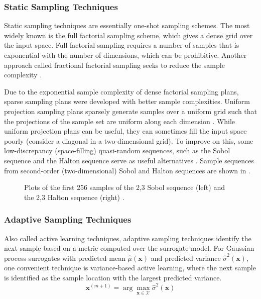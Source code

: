 \documentclass[conference,final]{IEEEtran}
\begin{document}
	\subsubsection{Static Sampling Techniques}
	Static sampling techniques are essentially one-shot sampling schemes. The most widely known is the full factorial sampling scheme, which gives a dense grid over the input space. Full factorial sampling requires a number of samples that is exponential with the number of dimensions, which can be prohibitive. Another approach called fractional factorial sampling seeks to reduce the sample complexity \cite{george2005statistics}. 
	
	Due to the exponential sample complexity of dense factorial sampling plans, sparse sampling plans were developed with better sample complexities. Uniform projection sampling plans sparsely generate samples over a uniform grid such that the projections of the sample set are uniform along each dimension \cite{Kochenderfer2019AlgorithmsOptimization}. While uniform projection plans can be useful, they can sometimes fill the input space poorly (consider a diagonal in a two-dimensional grid). To improve on this, some low-discrepancy (space-filling) quasi-random sequences, such as the Sobol sequence and the Halton sequence serve as useful alternatives \cite{Sobol1967OnIntegrals,Halton1964AlgorithmSequence}. Sample sequences from second-order (two-dimensional) Sobol and Halton sequences are shown in .
	
	\begin{figure}[htbp]
	    \centering
	    
	    
	    \caption{Plots of the first 256 samples of the 2,3 Sobol sequence (left) and the 2,3 Halton sequence (right) \cite{SobolSequence,HaltonSequence}.}
	    \label{fig:sobol_halton}
	\end{figure}
	
    \subsubsection{Adaptive Sampling Techniques}	
    Also called active learning techniques, adaptive sampling techniques identify the next sample based on a metric computed over the surrogate model. For Gaussian process surrogates with predicted mean $\hat{\mu}(\boldsymbol{x})$ and predicted variance $\hat{\sigma}^2({\boldsymbol{x}})$, one convenient technique is variance-based active learning, where the next sample is identified as the sample location with the largest predicted variance.
    \begin{equation}
        \boldsymbol{x}^{(m+1)} = \arg\max_{\boldsymbol{x}\in\mathcal{X}} \hat{\sigma}^2(\boldsymbol{x})
    \end{equation}
    
\end{document}
